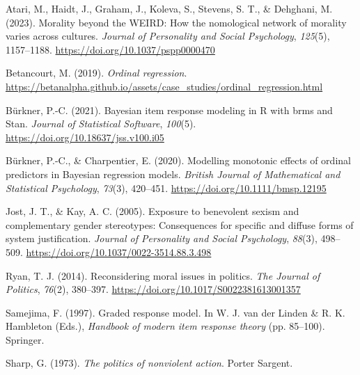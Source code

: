 \documentclass[12pt, letterpaper]{article}
\newenvironment{CSLReferences}[2]{}{}
\begin{document}
\hypertarget{refs}{}
\begin{CSLReferences}{1}{0}
\leavevmode{}%
Atari, M., Haidt, J., Graham, J., Koleva, S., Stevens, S. T., \&
Dehghani, M. (2023). Morality beyond the {WEIRD}: {How} the nomological
network of morality varies across cultures. \emph{Journal of Personality
and Social Psychology}, \emph{125}(5), 1157--1188.
\url{https://doi.org/10.1037/pspp0000470}

\leavevmode{}%
Betancourt, M. (2019). \emph{Ordinal regression}.
\url{https://betanalpha.github.io/assets/case_studies/ordinal_regression.html}

\leavevmode{}%
Bürkner, P.-C. (2021). Bayesian item response modeling in {R} with brms
and {Stan}. \emph{Journal of Statistical Software}, \emph{100}(5).
\url{https://doi.org/10.18637/jss.v100.i05}

\leavevmode{}%
Bürkner, P.-C., \& Charpentier, E. (2020). Modelling monotonic effects
of ordinal predictors in {Bayesian} regression models. \emph{British
Journal of Mathematical and Statistical Psychology}, \emph{73}(3),
420--451. \url{https://doi.org/10.1111/bmsp.12195}

\leavevmode{}%
Jost, J. T., \& Kay, A. C. (2005). Exposure to benevolent sexism and
complementary gender stereotypes: Consequences for specific and diffuse
forms of system justification. \emph{Journal of Personality and Social
Psychology}, \emph{88}(3), 498--509.
\url{https://doi.org/10.1037/0022-3514.88.3.498}

\leavevmode{}%
Ryan, T. J. (2014). Reconsidering moral issues in politics. \emph{The
Journal of Politics}, \emph{76}(2), 380--397.
\url{https://doi.org/10.1017/S0022381613001357}

\leavevmode{}%
Samejima, F. (1997). Graded response model. In W. J. van der Linden \&
R. K. Hambleton (Eds.), \emph{Handbook of modern item response theory}
(pp. 85--100). Springer.

\leavevmode{}%
Sharp, G. (1973). \emph{The politics of nonviolent action}. Porter
Sargent.

\end{CSLReferences}
\end{document}
